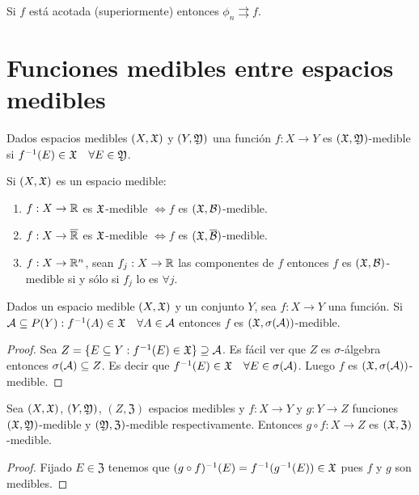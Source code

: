 \begin{note}
    Si $f$ está acotada (superiormente) entonces $\phi_n \rightrightarrows f$.
\end{note}

\section{Funciones medibles entre espacios medibles}

\begin{definition}
    Dados espacios medibles $(X, \mathfrak{X})$ y $(Y, \mathfrak{Y})$ una función $f : X \to Y$ es $(\mathfrak{X}, \mathfrak{Y})$-medible si $f^{-1}(E) \in \mathfrak{X} \quad \forall E \in \mathfrak{Y}$.
\end{definition}

\clearpage

\begin{eg}
    Si $(X, \mathfrak{X})$ es un espacio medible:
    \begin{enumerate}
        \item $f: X \to \mathbb{R}$ es $\mathfrak{X}$-medible $\iff f$ es $(\mathfrak{X}, \mathcal{B})$-medible.
        \item $f: X \to \overline{\mathbb{R}}$ es $\mathfrak{X}$-medible $\iff f$ es $(\mathfrak{X}, \overline{\mathcal{B}})$-medible.
        \item $f: X \to \mathbb{R}^n$, sean $f_j : X \to \mathbb{R}$ las componentes de $f$ entonces $f$ es $(\mathfrak{X}, \mathcal{B})$-medible si y sólo si $f_j$ lo es $\forall j$.
    \end{enumerate}
\end{eg}

\begin{prop}
    Dados un espacio medible $(X, \mathfrak{X})$ y un conjunto $Y$, sea $f: X \to Y$ una función.
    Si $\mathcal{A} \subseteq P(Y) : f^{-1}(A) \in \mathfrak{X} \quad \forall A \in \mathcal{A}$ entonces $f$ es $(\mathfrak{X}, \sigma(\mathcal{A}))$-medible.

    \begin{proof}
        Sea $Z = \{ E \subseteq Y : f^{-1}(E) \in \mathfrak{X} \} \supseteq \mathcal{A}$. Es fácil ver que $Z$ es $\sigma$-álgebra entonces $\sigma(\mathcal{A}) \subseteq Z$.
        Es decir que $f^{-1}(E) \in \mathfrak{X} \quad \forall E \in \sigma(\mathcal{A})$. Luego $f$ es $(\mathfrak{X}, \sigma(\mathcal{A}))$-medible.
    \end{proof}
\end{prop}

\begin{prop}
    Sea $(X, \mathfrak{X})$, $(Y, \mathfrak{Y})$, $(Z, \mathfrak{Z})$ espacios medibles y $f: X \to Y$ y $g: Y \to Z$ funciones $(\mathfrak{X}, \mathfrak{Y})$-medible y $(\mathfrak{Y}, \mathfrak{Z})$-medible respectivamente.
    Entonces $g \circ f : X \to Z$ es $(\mathfrak{X}, \mathfrak{Z})$-medible.
    \begin{proof}
        Fijado $E \in \mathfrak{Z}$ tenemos que $(g \circ f)^{-1}(E) = f^{-1}(g^{-1}(E)) \in \mathfrak{X}$ pues $f$ y $g$ son medibles.
    \end{proof}
\end{prop}